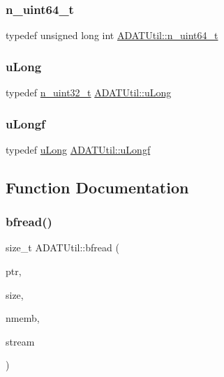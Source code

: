 \mbox{\label{namespaceADATUtil_afbd9ee3146133429698be74bcf422bd8}} 
\subsubsection{\texorpdfstring{n\_uint64\_t}{n\_uint64\_t}}
{\footnotesize\ttfamily typedef unsigned long int \mbox{\hyperlink{namespaceADATUtil_afbd9ee3146133429698be74bcf422bd8}{A\+D\+A\+T\+Util\+::n\+\_\+uint64\+\_\+t}}}

\mbox{\label{namespaceADATUtil_a51b60d81747dd992a62e9f1dea60fb13}} 
\subsubsection{\texorpdfstring{uLong}{uLong}}
{\footnotesize\ttfamily typedef \mbox{\hyperlink{namespaceADATUtil_ad945a8afa4db2d1f89b731964adae97e}{n\+\_\+uint32\+\_\+t}} \mbox{\hyperlink{namespaceADATUtil_a51b60d81747dd992a62e9f1dea60fb13}{A\+D\+A\+T\+Util\+::u\+Long}}}

\mbox{\label{namespaceADATUtil_adf7f8db2cc2f19fe6143cf8a2ad881f4}} 
\subsubsection{\texorpdfstring{uLongf}{uLongf}}
{\footnotesize\ttfamily typedef \mbox{\hyperlink{namespaceADATUtil_a51b60d81747dd992a62e9f1dea60fb13}{u\+Long}} \mbox{\hyperlink{namespaceADATUtil_adf7f8db2cc2f19fe6143cf8a2ad881f4}{A\+D\+A\+T\+Util\+::u\+Longf}}}



\subsection{Function Documentation}
\mbox{\label{namespaceADATUtil_af41a672c512fa9828e3ada70420985c9}} 
\subsubsection{\texorpdfstring{bfread()}{bfread()}}
{\footnotesize\ttfamily size\+\_\+t A\+D\+A\+T\+Util\+::bfread (\begin{DoxyParamCaption}\item[{void $\ast$}]{ptr,  }\item[{size\+\_\+t}]{size,  }\item[{size\+\_\+t}]{nmemb,  }\item[{F\+I\+LE $\ast$}]{stream }\end{DoxyParamCaption})}



